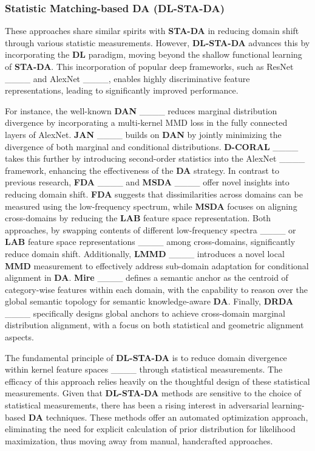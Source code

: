\subsubsection{Statistic Matching-based DA \textbf{(DL-STA-DA)}}
\label{Statistic matching-based DA}



 {These approaches share similar spirits  with \textbf{STA-DA} in reducing domain shift through various statistic measurements. However, \textbf{DL-STA-DA} advances this by incorporating the \textbf{DL} paradigm, moving beyond the shallow functional learning of \textbf{STA-DA}. This incorporation of popular deep frameworks, such as ResNet ____ and AlexNet ____, enables highly discriminative feature representations, leading to significantly improved performance.}





 {For instance, the well-known \textbf{DAN} ____ reduces marginal distribution divergence by incorporating a multi-kernel MMD loss in the fully connected layers of AlexNet. \textbf{JAN} ____ builds on \textbf{DAN} by jointly minimizing the divergence of both marginal and conditional distributions. \textbf{D-CORAL} ____ takes this further by introducing second-order statistics into the AlexNet ____ framework, enhancing the effectiveness of the \textbf{DA} strategy. In contrast to previous research, \textbf{FDA} ____ and \textbf{MSDA} ____ offer novel insights into reducing domain shift. \textbf{FDA} suggests that dissimilarities across domains can be measured using the low-frequency spectrum, while \textbf{MSDA} focuses on aligning cross-domains by reducing the \textbf{LAB} feature space representation. Both approaches, by swapping contents of different low-frequency spectra ____ or \textbf{LAB} feature space representations ____ among cross-domains, significantly reduce domain shift. Additionally, \textbf{LMMD} ____ introduces a novel local \textbf{MMD} measurement to effectively address sub-domain adaptation for conditional alignment in \textbf{DA}. \textbf{Mire} ____ defines a semantic anchor as the centroid of category-wise features within each domain, with the capability to reason over the global semantic topology for semantic knowledge-aware \textbf{DA}. Finally, \textbf{DRDA} ____ specifically designs global anchors to achieve cross-domain marginal distribution alignment, with a focus on both statistical and geometric alignment aspects.}



The fundamental principle of \textbf{DL-STA-DA} is to reduce domain divergence within kernel feature spaces ____ through statistical measurements. The efficacy of this approach relies heavily on the thoughtful design of these statistical measurements. Given that \textbf{DL-STA-DA} methods are sensitive to the choice of statistical measurements, there has been a rising interest in adversarial learning-based \textbf{DA} techniques. These methods offer an automated optimization approach, eliminating the need for explicit calculation of prior distribution for likelihood maximization, thus moving away from manual, handcrafted approaches.






